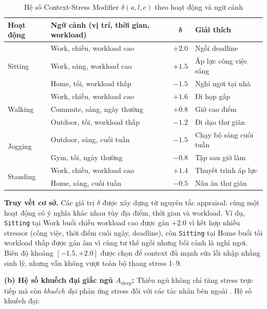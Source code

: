 \begin{table}[H]
\centering
\caption{Hệ số Context-Stress Modifier $\delta(a, l, c)$ theo hoạt động và ngữ cảnh}
\label{tab:context_stress_patterns}
\small
\begin{tabular}{|l|l|c|l|}
\hline
\textbf{Hoạt động} & \textbf{Ngữ cảnh (vị trí, thời gian, workload)} & $\boldsymbol{\delta}$ & \textbf{Giải thích} \\
\hline
\multirow{3}{*}{Sitting} & Work, chiều, workload cao & $+2.0$ & Ngồi deadline \\
                         & Work, sáng, workload cao & $+1.5$ & Áp lực công việc sáng \\
                         & Home, tối, workload thấp & $-1.5$ & Nghỉ ngơi tại nhà \\
\hline
\multirow{3}{*}{Walking} & Work, chiều, workload cao & $+1.6$ & Đi họp gấp \\
                         & Commute, sáng, ngày thường & $+0.8$ & Giờ cao điểm \\
                         & Outdoor, tối, workload thấp & $-1.2$ & Đi dạo thư giãn \\
\hline
\multirow{2}{*}{Jogging} & Outdoor, sáng, cuối tuần & $-1.5$ & Chạy bộ sáng cuối tuần \\
                         & Gym, tối, ngày thường & $-0.8$ & Tập sau giờ làm \\
\hline
\multirow{2}{*}{Standing} & Work, chiều, workload cao & $+1.4$ & Thuyết trình áp lực \\
                          & Home, sáng, cuối tuần & $-0.5$ & Nấu ăn thư giãn \\
\hline
\end{tabular}
\end{table}

\textbf{Truy vết cơ sở.} Các giá trị $\delta$ được xây dựng từ nguyên tắc appraisal: cùng một hoạt động có ý nghĩa khác nhau tùy địa điểm, thời gian và workload. Ví dụ, \texttt{Sitting} tại Work buổi chiều workload cao được gán $+2.0$ vì kết hợp nhiều stressor (công việc, thời điểm cuối ngày, deadline), còn \texttt{Sitting} tại Home buổi tối workload thấp được gán âm vì cùng tư thế ngồi nhưng bối cảnh là nghỉ ngơi. Biên độ khoảng $[-1.5,+2.0]$ được chọn để context đủ mạnh sửa lỗi nhập nhằng sinh lý, nhưng vẫn không vượt toàn bộ thang stress 1--9.

\textbf{(b) Hệ số khuếch đại giấc ngủ $A_{\text{sleep}}$:} Thiếu ngủ không chỉ tăng stress trực tiếp mà còn \textit{khuếch đại} phản ứng stress đối với các tác nhân bên ngoài \cite{mcewen2008central, yoo2007sleep}. Hệ số khuếch đại:

